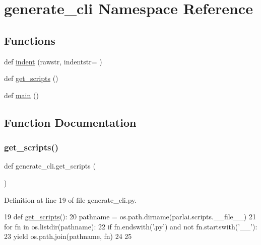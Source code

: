 \hypertarget{namespacegenerate__cli}{}\section{generate\+\_\+cli Namespace Reference}
\label{namespacegenerate__cli}
\subsection*{Functions}
\begin{DoxyCompactItemize}
\item 
def \hyperlink{namespacegenerate__cli_a398461fabd4559f4d4d041df98c8cb43}{indent} (rawstr, indentstr=\textquotesingle{} \textquotesingle{})
\item 
def \hyperlink{namespacegenerate__cli_a88235ac81a788e005e9aa0dd7624307c}{get\+\_\+scripts} ()
\item 
def \hyperlink{namespacegenerate__cli_ac2397b33242e0f40a20f33a2ea5beebf}{main} ()
\end{DoxyCompactItemize}


\subsection{Function Documentation}
\mbox{\label{namespacegenerate__cli_a88235ac81a788e005e9aa0dd7624307c}} 
\subsubsection{\texorpdfstring{get\+\_\+scripts()}{get\_scripts()}}
{\footnotesize\ttfamily def generate\+\_\+cli.\+get\+\_\+scripts (\begin{DoxyParamCaption}{ }\end{DoxyParamCaption})}



Definition at line 19 of file generate\+\_\+cli.\+py.


\begin{DoxyCode}
19 \textcolor{keyword}{def }\hyperlink{namespacegenerate__cli_a88235ac81a788e005e9aa0dd7624307c}{get\_scripts}():
20     pathname = os.path.dirname(parlai.scripts.\_\_file\_\_)
21     \textcolor{keywordflow}{for} fn \textcolor{keywordflow}{in} os.listdir(pathname):
22         \textcolor{keywordflow}{if} fn.endswith(\textcolor{stringliteral}{'.py'}) \textcolor{keywordflow}{and} \textcolor{keywordflow}{not} fn.startswith(\textcolor{stringliteral}{'\_\_'}):
23             \textcolor{keywordflow}{yield} os.path.join(pathname, fn)
24 
25 
\end{DoxyCode}
\mbox{\label{namespacegenerate__cli_a398461fabd4559f4d4d041df98c8cb43}} 

